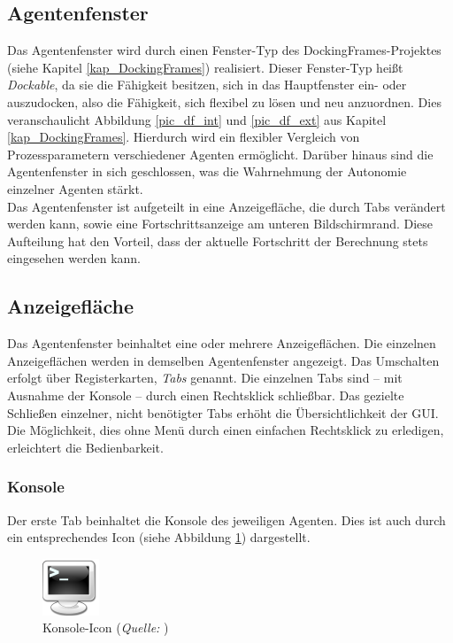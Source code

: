 \documentclass[a4paper,12pt,oneside,openright,onecolumn,final,titlepage,fleqn,ngerman]{scrreprt}
\newcommand{\parag}{\\[2ex]}
\newcommand{\imgCaption}[2]{\caption[#1]{#1 (\textit{Quelle:} #2)}}			%
\begin{document}
	\subsection{Agentenfenster}\label{kap_impl_agwin}
	Das Agentenfenster wird durch einen Fenster-Typ des DockingFrames-Pro\-jektes (siehe Kapitel \ref{kap_DockingFrames}) realisiert. Dieser Fenster-Typ heißt \emph{Dockable}, da sie die Fähigkeit besitzen, sich in das Hauptfenster \glqq{}ein- oder auszudocken\grqq{}, also die Fähigkeit, sich flexibel zu lösen und neu anzuordnen. Dies veranschaulicht Abbildung \ref{pic_df_int} und \ref{pic_df_ext} aus Kapitel \ref{kap_DockingFrames}. Hierdurch wird ein flexibler Vergleich von Prozessparametern verschiedener Agenten ermöglicht. Darüber hinaus sind die Agentenfenster in sich geschlossen, was die Wahrnehmung der Autonomie einzelner Agenten stärkt.\parag{}
	Das Agentenfenster ist aufgeteilt in eine Anzeigefläche, die durch Tabs verändert werden kann, sowie eine Fortschrittsanzeige am unteren Bildschirmrand. Diese Aufteilung hat den Vorteil, dass der aktuelle Fortschritt der Berechnung stets eingesehen werden kann.
	
	\subsection{Anzeigefläche}
	Das Agentenfenster beinhaltet eine oder mehrere Anzeigeflächen. Die einzelnen Anzeigeflächen werden in demselben Agentenfenster angezeigt. Das Umschalten erfolgt über Registerkarten, \emph{Tabs} genannt. Die einzelnen Tabs sind -- mit Ausnahme der Konsole -- durch einen Rechtsklick schließbar. Das gezielte Schließen einzelner, nicht benötigter Tabs erhöht die Übersichtlichkeit der GUI. Die Möglichkeit, dies ohne Menü durch einen einfachen Rechtsklick zu erledigen, erleichtert die Bedienbarkeit.

	\subsubsection{Konsole}\label{kap_impl_konsole}
	Der erste Tab beinhaltet die Konsole des jeweiligen Agenten. Dies ist auch durch ein entsprechendes Icon (siehe Abbildung \ref{icon_console}) dargestellt.
	\begin{figure}[ht]
		\centering
		\includegraphics[width=64px]{res/console.png}
		\imgCaption{Konsole-Icon}{}
		\label{icon_console}
	\end{figure}
	
\end{document}
